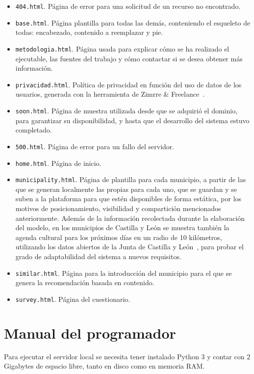 \begin{itemize}
	\item \texttt{404.html}. Página de error para una solicitud de un recurso no encontrado.
	\item \texttt{base.html}. Página plantilla para todas las demás, conteniendo el esqueleto de todas: encabezado, contenido a reemplazar y pie.
	\item \texttt{metodologia.html}. Página usada para explicar cómo se ha realizado el ejecutable, las fuentes del trabajo y cómo contactar si se desea obtener más información.
	\item \texttt{privacidad.html}. Política de privacidad en función del uso de datos de los usuarios, generada con la herramienta de Zimrre \& Freelance~\cite{privacidad}.
	\item \texttt{soon.html}. Página de muestra utilizada desde que se adquirió el dominio, para garantizar su disponibilidad, y hasta que el desarrollo del sistema estuvo completado.
	\item \texttt{500.html}. Página de error para un fallo del servidor.
	\item \texttt{home.html}. Página de inicio.
	\item \texttt{municipality.html}. Página de plantilla para cada municipio, a partir de las que se generan localmente las propias para cada uno, que se guardan y se suben a la plataforma para que estén disponibles de forma estática, por los motivos de posicionamiento, visibilidad y compartición mencionados anteriormente. Además de la información recolectada durante la elaboración del modelo, en los municipios de Castilla y León se muestra también la agenda cultural para los próximos días en un radio de 10 kilómetros, utilizando los datos abiertos de la Junta de Castilla y León~\cite{agenda}, para probar el grado de adaptabilidad del sistema a nuevos requisitos.
	\item \texttt{similar.html}. Página para la introducción del municipio para el que se genera la recomendación basada en contenido.
	\item \texttt{survey.html}. Página del cuestionario.
\end{itemize}

\section{Manual del programador}

Para ejecutar el servidor local se necesita tener instalado Python 3 y contar con 2 Gigabytes de espacio libre, tanto en disco como en memoria RAM.

